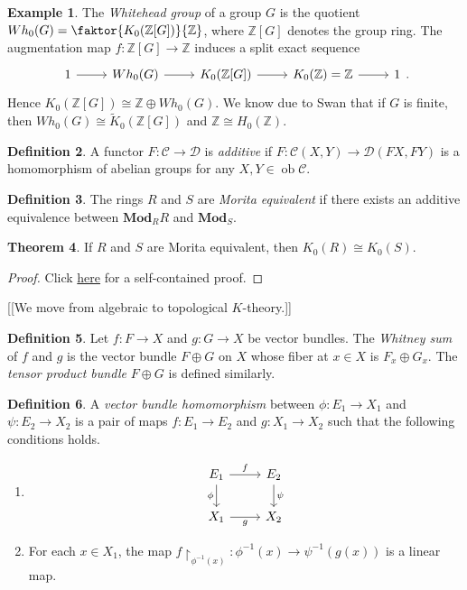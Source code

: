 \documentclass[10pt,letterpaper,cm]{nupset}
\theoremstyle{definition}
\newtheorem{definition}{Definition}
\newtheorem{exmp}[definition]{Example}
\theoremstyle{theorem}
\newtheorem{theorem}[definition]{Theorem}
\theoremstyle{remark}
\newcommand{\Z}{\mathbb Z}
\newcommand{\1}{\mathbf{1}}
\renewcommand{\c}{\mathscr{C}}
\renewcommand{\d}{\mathscr{D}}
\newcommand{\0}{\vec 0}
\DeclareMathOperator{\ob}{ob}
\begin{document}
\begin{exmp}
The \textit{Whitehead group} of a group $G$ is the quotient $Wh_0(G) =\faktor{K_0(\Z[G])}{\Z}$, where $\Z[G]$ denotes the group ring. The augmentation map $f: \Z[G] \to \Z$ induces a split exact sequence 
\[
\begin{tikzcd}
1 \arrow[r] & Wh_0(G) \arrow[r] & K_0(\Z[G]) \arrow[r] & K_0(\Z) =\mathbb Z \arrow[r] & 1
\end{tikzcd}.
\]
 Hence $K_0(\Z[G]) \cong \Z \oplus Wh_0(G)$. We know due to Swan that if $G$ is finite, then $Wh_0(G) \cong \widetilde{K}_0(\Z[G])$  and $\Z \cong H_0(\Z)$. 
\end{exmp}

\begin{definition}
A functor $F: \c \to \d$ is \textit{additive} if $F: \c(X, Y) \to \d(FX, FY)$ is a homomorphism of abelian groups for any $X, Y \in \ob \c$.
\end{definition}

\begin{definition}
The rings $R$ and $S$ are \textit{Morita equivalent} if there exists an additive equivalence between $\mathbf{Mod}_R$$R$ and $\mathbf{Mod}_S$. 
\end{definition}

\begin{theorem}
If $R$ and $S$ are Morita equivalent, then $K_0(R) \cong K_0(S)$.
\end{theorem}
\begin{proof}
Click \href{http://www.staff.science.uu.nl/~henri105/Seminars/AlgKthy2011Talk3.pdf}{here} for a self-contained proof.
\end{proof}

[[We move from algebraic to topological $K$-theory.]]

\begin{definition}
Let $f: F \to X$ and $g: G \to X$ be vector bundles. The \textit{Whitney sum} of $f$ and $g$ is the vector bundle $F \oplus G$ on $X$ whose fiber at $x \in X$ is $F_x \oplus G_x$.  The \textit{tensor product bundle} $F \oplus G$ is defined similarly.
\end{definition}

\begin{definition}
A \textit{vector bundle homomorphism} between $\phi : E_1 \to X_1$ and $\psi : E_2 \to X_2$ is a pair of maps $f: E_1 \to E_2$ and $g: X_1 \to X_2$ such that the following conditions holds.
\begin{enumerate}
\item 
\[
\begin{tikzcd}
E_1 \arrow[r, "f"] \arrow[d, "\phi"'] & E_2 \arrow[d, "\psi"] \\
X_1 \arrow[r, "g"'] & X_2
\end{tikzcd}
\]
\item For each $x \in X_1$, the map $f \restriction_{\phi^{-1}(x)} : \phi^{-1}(x) \to \psi^{-1}(g(x))$ is a linear map.
\end{enumerate}
\end{definition}
\end{document}
